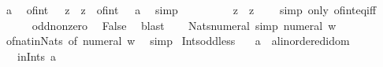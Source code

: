 \begin{isabellebody}
\ a\ \isamarkupfalse%
\ {\isachardoublequoteopen}of{\isacharunderscore}{\kern0pt}int\ {\isacharparenleft}{\kern0pt}{}\ {\isacharplus}{\kern0pt}\ z\ {\isacharplus}{\kern0pt}\ z{\isacharparenright}{\kern0pt}\ {\isacharequal}{\kern0pt}\ {\isacharparenleft}{\kern0pt}of{\isacharunderscore}{\kern0pt}int\ {}\ {\isacharcolon}{\kern0pt}{\isacharcolon}{\kern0pt}\ {\isacharprime}{\kern0pt}a{\isacharparenright}{\kern0pt}{\isachardoublequoteclose}\ \isamarkupfalse%
\ simp\isanewline
\ \ \ \ \isamarkupfalse%
\ \isamarkupfalse%
\ {\isachardoublequoteopen}{}\ {\isacharplus}{\kern0pt}\ z\ {\isacharplus}{\kern0pt}\ z\ {\isacharequal}{\kern0pt}\ {}{\isachardoublequoteclose}\ \isamarkupfalse%
\ {\isacharparenleft}{\kern0pt}simp\ only{\isacharcolon}{\kern0pt}\ of{\isacharunderscore}{\kern0pt}int{\isacharunderscore}{\kern0pt}eq{\isacharunderscore}{\kern0pt}iff{\isacharparenright}{\kern0pt}\isanewline
\ \ \ \ \isamarkupfalse%
\ odd{\isacharunderscore}{\kern0pt}nonzero\ \isamarkupfalse%
\ False\ \isamarkupfalse%
\ blast\isanewline
\ \ \isamarkupfalse%
\isanewline
{}\isamarkupfalse%
%
\endisatagproof
{\isafoldproof}%
%
\isadelimproof
\isanewline
%
\endisadelimproof
\isanewline
{}\isamarkupfalse%
\ Nats{\isacharunderscore}{\kern0pt}numeral\ {\isacharbrackleft}{\kern0pt}simp{\isacharbrackright}{\kern0pt}{\isacharcolon}{\kern0pt}\ {\isachardoublequoteopen}numeral\ w\ {\isasymin}\ {\isasymnat}{\isachardoublequoteclose}\isanewline
%
\isadelimproof
\ \ %
\endisadelimproof
%
\isatagproof
{}\isamarkupfalse%
\ of{\isacharunderscore}{\kern0pt}nat{\isacharunderscore}{\kern0pt}in{\isacharunderscore}{\kern0pt}Nats\ {\isacharbrackleft}{\kern0pt}of\ {\isachardoublequoteopen}numeral\ w{\isachardoublequoteclose}{\isacharbrackright}{\kern0pt}\ \isamarkupfalse%
\ simp%
\endisatagproof
{\isafoldproof}%
%
\isadelimproof
\isanewline
%
\endisadelimproof
\isanewline
{}\isamarkupfalse%
\ Ints{\isacharunderscore}{\kern0pt}odd{\isacharunderscore}{\kern0pt}less{\isacharunderscore}{\kern0pt}{}{\isacharcolon}{\kern0pt}\isanewline
\ \ \ a\ {\isacharcolon}{\kern0pt}{\isacharcolon}{\kern0pt}\ {\isachardoublequoteopen}{\isacharprime}{\kern0pt}a{\isacharcolon}{\kern0pt}{\isacharcolon}{\kern0pt}linordered{\isacharunderscore}{\kern0pt}idom{\isachardoublequoteclose}\isanewline
\ \ \ in{\isacharunderscore}{\kern0pt}Ints{\isacharcolon}{\kern0pt}\ {\isachardoublequoteopen}a\ {\isasymin}\ {\isasymint}{\isachardoublequoteclose}\isanewline

\end{isabellebody}

